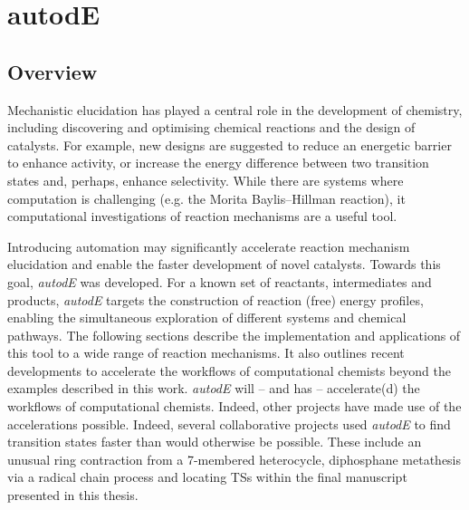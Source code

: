 \documentclass[../../main.tex]{subfiles}
\begin{document}
\setcounter{footnote}{0} 


\chapter{autodE}

\section{Overview}


Mechanistic elucidation has played a central role in the development of chemistry, including discovering and optimising chemical reactions and the design of catalysts. For example, new designs are suggested to reduce an energetic barrier to enhance activity, or increase the energy difference between two transition states and, perhaps, enhance selectivity. While there are systems where computation is challenging (e.g. the Morita Baylis–Hillman reaction\cite{Plata2015}), it computational investigations of reaction mechanisms are a useful tool.

Introducing automation may significantly accelerate reaction mechanism elucidation and enable the faster development of novel catalysts. Towards this goal, \emph{autodE} was developed. For a known set of reactants, intermediates and products,  \emph{autodE} targets the construction of reaction (free) energy profiles, enabling the simultaneous exploration of different systems and chemical pathways. The following sections describe the implementation and applications of this tool to a wide range of reaction mechanisms. It also outlines recent developments to accelerate the workflows of computational chemists beyond the examples described in this work. \emph{autodE} will -- and has -- accelerate(d) the workflows of computational chemists. Indeed, other projects have made use of the accelerations possible. Indeed, several collaborative projects used \emph{autodE} to find transition states faster than would otherwise be possible. These include an unusual ring contraction from a 7-membered heterocycle,\cite{Wang2020} diphosphane metathesis via a radical chain process\cite{Branfoot2021} and locating TSs within the final manuscript presented in this thesis.\cite{Young2021GAP}


\clearpage
\end{document}
